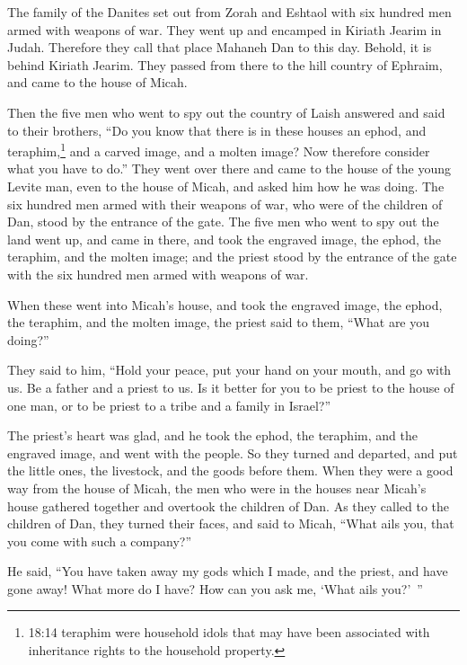 \myverse{}The family of the Danites set out from Zorah and Eshtaol with
six hundred men armed with weapons of war.
\myverse{}They went up and encamped in Kiriath Jearim in Judah. Therefore they call
that place Mahaneh Dan to this day. Behold, it is behind Kiriath Jearim.
\myverse{}They passed from there to the hill country of Ephraim, and came to the house
of Micah.

\myverse{}Then the five men who went to spy out the country of Laish answered
and said to their brothers, “Do you know that there is in these houses an ephod, and teraphim,\footnote{18:14 teraphim were household idols that may have been associated with inheritance rights to the household
	property.} and a carved image, and a molten image? Now therefore consider what you have to do.”
\myverse{}They went over there and came to the house of the young Levite man, even
to the house of Micah, and asked him how he was doing.
\myverse{}The six hundred men armed with their weapons of war, who were of the children
of Dan, stood by the entrance of the gate.
\myverse{}The five men who went to spy out the land went up, and came in there, and
took the engraved image, the ephod, the teraphim, and the molten image; and the priest stood by the entrance
of the gate with the six hundred men armed with weapons of war.

\myverse{}When these went into Micah’s house, and took the engraved image,
the ephod, the teraphim, and the molten image, the priest said to them, “What are you doing?”

\myverse{}They said to him, “Hold your peace, put your hand on your mouth,
and go with us. Be a father and a priest to us. Is it better for you to be priest to the house of one
man, or to be priest to a tribe and a family in Israel?”

\myverse{}The priest’s heart was glad, and he took the ephod, the teraphim,
and the engraved image, and went with the people.
\myverse{}So they turned and departed, and put the little ones, the livestock, and
the goods before them.
\myverse{}When they were a good way from the house of Micah, the men who were in the
houses near Micah’s house gathered together and overtook the children of Dan.
\myverse{}As they called to the children of Dan, they turned their faces, and said
to Micah, “What ails you, that you come with such a company?”

\myverse{}He said, “You have taken away my gods which I made, and the
priest, and have gone away! What more do I have? How can you ask me, ‘What ails you?’ ”

